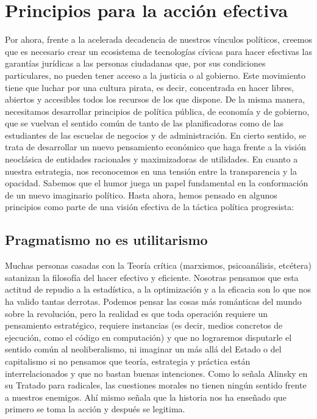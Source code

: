 \chapter{Principios para la acción efectiva}
\label{cha:principios}

Por ahora, frente a la acelerada decadencia de nuestros vínculos políticos, creemos que es necesario crear un ecosistema de tecnologías cívicas para hacer efectivas las garantías jurídicas a las personas ciudadanas que, por sus condiciones particulares, no pueden tener acceso a la justicia o al gobierno. Este movimiento tiene que luchar por una cultura pirata, es decir, concentrada en hacer libres, abiertos y accesibles todos los recursos de los que dispone. De la misma manera, necesitamos desarrollar principios de política pública, de economía y de gobierno, que se vuelvan el sentido común de tanto de las planificadoras como de las estudiantes de las escuelas de negocios y de administración. En cierto sentido, se trata de desarrollar un nuevo pensamiento económico que haga frente a la visión neoclásica de entidades racionales y maximizadoras de utilidades. En cuanto a nuestra estrategia, nos reconocemos en una tensión entre la transparencia y la opacidad. Sabemos que el humor juega un papel fundamental en la conformación de un nuevo imaginario político. Hasta ahora, hemos pensado en algunos principios como parte de una visión efectiva de la táctica política progresista:

\section{Pragmatismo no es utilitarismo}
\label{sec:pragmatismo}

Muchas personas casadas con la Teoría crítica (marxismos, psicoanálisis, etcétera) satanizan la filosofía del hacer efectivo y eficiente. Nosotras pensamos que esta actitud de repudio a la estadística, a la optimización y a la eficacia son lo que nos ha valido tantas derrotas. Podemos pensar las cosas más románticas del mundo sobre la revolución, pero la realidad es que toda operación requiere un pensamiento estratégico, requiere instancias (es decir, medios concretos de ejecución, como el código en computación) y que no lograremos disputarle el sentido común al neoliberalismo, ni imaginar un más allá del Estado o del capitalismo si no pensamos que teoría, estrategia y práctica están interrelacionados y que no bastan buenas intenciones. Como lo señala Alinsky en su Tratado para radicales, las cuestiones morales no tienen ningún sentido frente a nuestros enemigos. Ahí mismo señala que la historia nos ha enseñado que primero se toma la acción y después se legitima.

